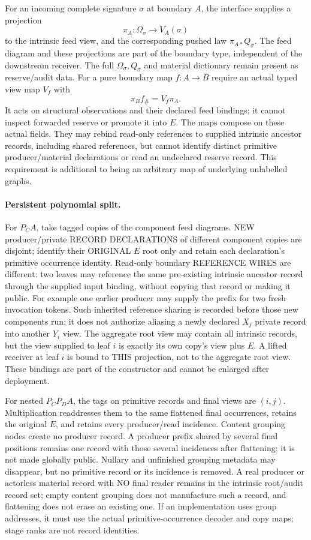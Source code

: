 \documentclass[11pt]{article}
\begin{document}
For an incoming complete signature $\sigma$ at boundary $A$, the interface supplies a projection
\[
             \pi_A:\Omega_\sigma\longrightarrow V_A(\sigma)
                                                               \tag{1}
\]
to the intrinsic feed view, and the corresponding pushed law $\pi_{A*}Q_\sigma$. The feed diagram and these projections are part of the boundary type, independent of the downstream receiver. The full $\Omega_\sigma,Q_\sigma$ and material dictionary remain present as reserve/audit data. For a pure boundary map $f:A\to B$ require an actual typed view map $V_f$ with
\[
           \pi_B f_\#=V_f\pi_A.                              \tag{2}
\]
It acts on structural observations and their declared feed bindings; it cannot inspect forwarded reserve or promote it into $E$. The maps compose on these actual fields. They may rebind read-only references to supplied intrinsic ancestor records, including shared references, but cannot identify distinct primitive producer/material declarations or read an undeclared reserve record. This requirement is additional to being an arbitrary map of underlying unlabelled graphs.

\paragraph{Persistent polynomial split.}
For $P_CA$, take tagged copies of the component feed diagrams. NEW producer/private RECORD DECLARATIONS of different component copies are disjoint; identify their ORIGINAL $E$ root only and retain each declaration's primitive occurrence identity. Read-only boundary REFERENCE WIRES are different: two leaves may reference the same pre-existing intrinsic ancestor record through the supplied input binding, without copying that record or making it public. For example one earlier producer may supply the prefix for two fresh invocation tokens. Such inherited reference sharing is recorded before those new components run; it does not authorize aliasing a newly declared $X_j$ private record into another $Y_i$ view. The aggregate root view may contain all intrinsic records, but the view supplied to leaf $i$ is exactly its own copy's view plus $E$. A lifted receiver at leaf $i$ is bound to THIS projection, not to the aggregate root view. These bindings are part of the constructor and cannot be enlarged after deployment.

For nested $P_CP_DA$, the tags on primitive records and final views are $(i,j)$. Multiplication readdresses them to the same flattened final occurrences, retains the original $E$, and retains every producer/read incidence. Content grouping nodes create no producer record. A producer prefix shared by several final positions remains one record with those several incidences after flattening; it is not made globally public. Nullary and unfinished grouping metadata may disappear, but no primitive record or its incidence is removed. A real producer or actorless material record with NO final reader remains in the intrinsic root/audit record set; empty content grouping does not manufacture such a record, and flattening does not erase an existing one. If an implementation uses group addresses, it must use the actual primitive-occurrence decoder and copy maps; stage ranks are not record identities.
\end{document}

